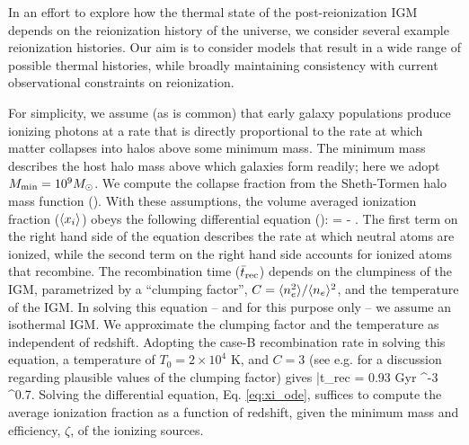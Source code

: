 In an effort to explore how the thermal state of the post-reionization 
IGM depends on the reionization history of the universe, we consider several example reionization histories. 
Our aim is to consider models that result in a wide range of possible thermal histories, while broadly maintaining 
consistency with current observational constraints on reionization. 

For simplicity, we assume (as is common) that early galaxy populations produce ionizing photons at a rate
that is directly proportional
to the rate at which matter collapses into halos above some minimum mass. The minimum mass describes the 
host halo mass above which galaxies form readily; here we adopt $M_{\rm min} = 10^9 M_\odot$. We compute the collapse fraction
from the Sheth-Tormen halo mass function (\citealt{Sheth:1999su}).
With these assumptions, the volume averaged ionization fraction ($\langle x_i \rangle$) obeys the following differential equation (\citealt{1987ApJ...321L.107S,1999ApJ...514..648M}):
\beqa
{} = \zeta {} - .
\label{eq:xi_ode}
\eeqa
The first term on the right hand side of the equation describes the rate at which neutral atoms are ionized, while the second
term on the right hand side accounts for ionized atoms that recombine. The recombination time ($\bar{t}_{\rm rec}$) depends on the clumpiness of the IGM,
parametrized by a ``clumping factor'', $C=\langle n_e^2 \rangle/\langle n_e \rangle^2$, and the temperature of the IGM. In solving this equation -- and for this purpose only -- we assume an isothermal
IGM. We approximate the clumping factor and the temperature as independent of redshift.
Adopting the case-B recombination rate in solving this equation, a temperature of $T_0 = 2 \times 10^4$ K, and $C=3$ (see e.g. \citealt{Pawlik:2008mr,McQuinn:2011aa} for a discussion regarding plausible values of the clumping factor) gives
\beqa
\bar{t}_{\rm rec} = 0.93 {\rm Gyr}  ^{-3} ^{0.7}.
\label{eq:trec}
\eeqa
Solving the differential equation, Eq. \ref{eq:xi_ode}, suffices to compute the average ionization fraction as a function of redshift, given
the minimum mass and efficiency, $\zeta$, of the ionizing sources.

